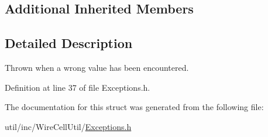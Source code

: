 \subsection*{Additional Inherited Members}


\subsection{Detailed Description}
Thrown when a wrong value has been encountered. 

Definition at line 37 of file Exceptions.\+h.



The documentation for this struct was generated from the following file\+:\begin{DoxyCompactItemize}
\item 
util/inc/\+Wire\+Cell\+Util/\hyperlink{_exceptions_8h}{Exceptions.\+h}\end{DoxyCompactItemize}
